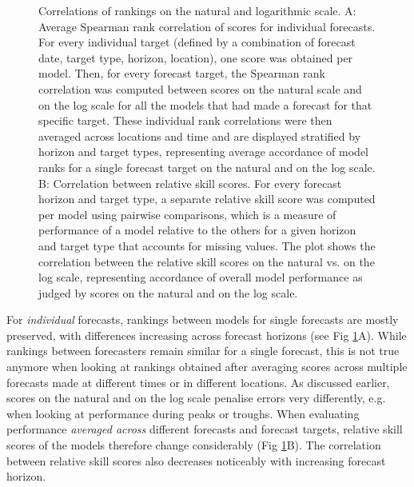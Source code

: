 \documentclass[10pt,letterpaper]{article}
\begin{document}
\begin{figure}[h!]
    \centering
    \caption{Correlations of rankings on the natural and logarithmic scale. A: Average Spearman rank correlation of scores for individual forecasts. For every individual target (defined by a combination of forecast date, target type, horizon, location), one score was obtained per model. Then, for every forecast target, the Spearman rank correlation was computed between scores on the natural scale and on the log scale for all the models that had made a forecast for that specific target. These individual rank correlations were then averaged across locations and time and are displayed stratified by horizon and target types, representing average accordance of model ranks for a single forecast target on the natural and on the log scale. B: Correlation between relative skill scores. For every forecast horizon and target type, a separate relative skill score was computed per model using pairwise comparisons, which is a measure of performance of a model relative to the others for a given horizon and target type that accounts for missing values. The plot shows the correlation between the relative skill scores on the natural vs. on the log scale, representing accordance of overall model performance as judged by scores on the natural and on the log scale.}
    \label{fig:HUB-cors}
\end{figure}

For \textit{individual} forecasts, rankings between models for single forecasts are mostly preserved, with differences increasing across forecast horizons (see Fig \ref{fig:HUB-cors}A). While rankings between forecasters remain similar for a single forecast, this is not true anymore when looking at rankings obtained after averaging scores across multiple forecasts made at different times or in different locations. As discussed earlier, scores on the natural and on the log scale penalise errors very differently, e.g. when looking at performance during peaks or troughs. When evaluating performance \textit{averaged across} different forecasts and forecast targets, relative skill scores of the models therefore change considerably (Fig \ref{fig:HUB-cors}B). The correlation between relative skill scores also decreases noticeably with increasing forecast horizon. 
\end{document}

